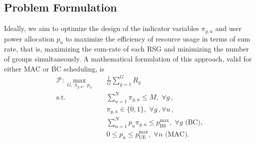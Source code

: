 




\subsection{Problem Formulation}
Ideally, we aim to optimize the design of the indicator 
variables $\pi_{g,u}$ and user power allocation $p_u$
to maximize the efficiency of resource usage in terms of sum rate, that is, maximizing the sum-rate of each RSG and minimizing the number of groups simultaneously. 
A mathematical formulation of this approach, valid for either MAC or BC scheduling, is %
\begin{subequations}\label{usch:eqn:sumrate_optimization}
	\begin{align}
		\mathcal{P}^{}:\max_{G,\;\pi_{g,u},\;\,p_u} &\quad\frac{1}{G}\sum\nolimits_{g =1}^{G} R_g^{}\label{usch:eqn:optimization_obj}\\
		\text{s.t.}  
		&\quad\sum\nolimits_{u=1}^N\pi_{g,u}\leq M,\,\, \forall g\,,\label{usch:eqn:optimization_userConstraint}\\
		&\quad\pi_{g,u}\in\{0,1\},\,\, \forall g\,,\forall u\,
		,\label{usch:eqn:optimization_binaryExclusivity}\\
		&\quad \sum\nolimits_{n=1}^N p_u\pi_{g,u}\leq p_{\mathrm{BS}}^{\mathrm{max}},\,\, \forall g\text{ (BC)},\label{usch:eqn:optimization_powerAllocation_bc}\\
		&\quad0\leq p_u\leq p_{\mathrm{UE}}^{\mathrm{max}},\,\, \forall n\text{ (MAC)}.\label{usch:eqn:optimization_powerAllocation_mac}
	\end{align}
\end{subequations}


